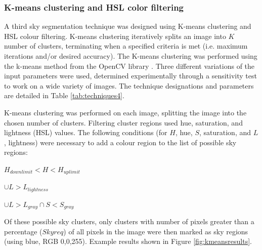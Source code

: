 \documentclass[final,3p,times,authoryear]{elsarticle}
\begin{document}
\subsubsection{K-means clustering and HSL color filtering}\label{sec:kmeans}
A third sky segmentation technique was designed using K-means clustering and HSL colour filtering. K-means clustering iteratively splits an image into $K$ number of clusters, terminating when a specified criteria is met (i.e. maximum iterations and/or desired accuracy). The K-means clustering was performed using the k-means method from the OpenCV library \citep{Bradski2000}. Three different variations of the input parameters were used, determined experimentally through a sensitivity test to work on a wide variety of images. The technique designations and parameters are detailed in Table \ref{tab:techniques4}. 

K-means clustering was performed on each image, splitting the image into the chosen number of clusters. Filtering cluster regions used hue, saturation, and lightness (HSL) values. The following conditions (for $H$, hue, $S$, saturation, and $L$, lightness) were necessary to add a colour region to the list of possible sky regions: 

$H_{downlimit} < H < H_{uplimit}$

$\cup L > L_{lightness}$

$\cup L > L_{gray} \cap S < S_{gray}$

Of these possible sky clusters, only clusters with number of pixels greater than a percentage ($Skyreq$) of all pixels in the image were then marked as sky regions (using blue, RGB 0,0,255). Example results shown in Figure \ref{fig:kmeansresults}. 
\end{document}
